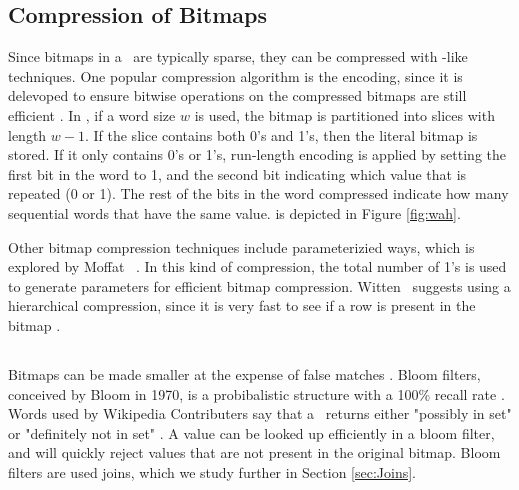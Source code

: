 \subsection{Compression of Bitmaps}
\label{sub:Compression of Bitmaps}
Since bitmaps in a \biti~are typically sparse, they can be compressed with \rle-like techniques. One popular compression algorithm is the  encoding, since it is delevoped to ensure bitwise operations on the compressed bitmaps are still efficient \cite{Bjorklund2011-wh}. In , if a word size $w$ is used, the bitmap is partitioned into slices with length $w-1$. If the slice contains both 0's and 1's, then the literal bitmap is stored. If it only contains 0's or 1's, run-length encoding is applied by setting the first bit in the word to 1, and the second bit indicating which value that is repeated (0 or 1). The rest of the bits in the word compressed indicate how many sequential words that have the same value.  is depicted in Figure \ref{fig:wah}.

Other bitmap compression techniques include parameterizied ways, which is explored by Moffat \ea~\cite{Moffat1992-tz}. In this kind of compression, the total number of 1's is used to generate parameters for efficient bitmap compression. Witten \ea~suggests using a hierarchical compression, since it is very fast to see if a row is present in the bitmap \cite{Witten1999-qq}. 


\subsection{\bloom}
\label{sub:Bloom Filter}
Bitmaps can be made smaller at the expense of false matches \cite{Witten1999-qq}. Bloom filters, conceived by Bloom in 1970, is a probibalistic structure with a 100\% recall rate \cite{Bloom1970-nr, Wikipedia_contributors2015-lq}. Words used by Wikipedia Contributers say that a \bloom~returns either "possibly in set" or "definitely not in set" \cite{Wikipedia_contributors2015-lq}. A value can be looked up efficiently in a bloom filter, and will quickly reject values that are not present in the original bitmap. Bloom filters are used joins, which we study further in Section \ref{sec:Joins}.


